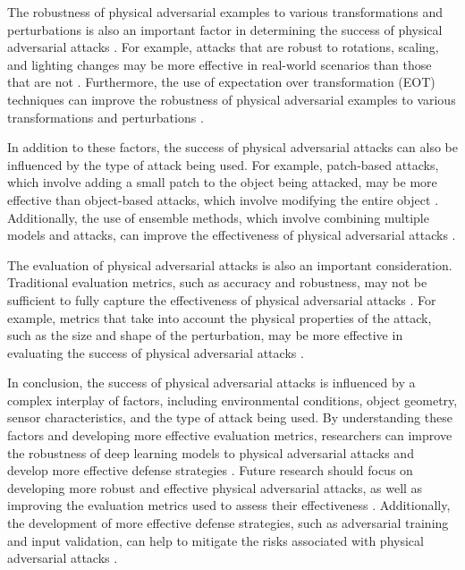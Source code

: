 \documentclass[11pt,a4paper]{article}
\begin{document}
The robustness of physical adversarial examples to various transformations and perturbations is also an important factor in determining the success of physical adversarial attacks \cite{doi:10.1609/aaai.v34i01.5443}. For example, attacks that are robust to rotations, scaling, and lighting changes may be more effective in real-world scenarios than those that are not \cite{arxiv:1802.06430}. Furthermore, the use of expectation over transformation (EOT) techniques can improve the robustness of physical adversarial examples to various transformations and perturbations \cite{doi:10.1109/cvpr42600.2020.01426}.

In addition to these factors, the success of physical adversarial attacks can also be influenced by the type of attack being used. For example, patch-based attacks, which involve adding a small patch to the object being attacked, may be more effective than object-based attacks, which involve modifying the entire object \cite{doi:10.1109/biosig52210.2021.9548291}. Additionally, the use of ensemble methods, which involve combining multiple models and attacks, can improve the effectiveness of physical adversarial attacks \cite{doi:10.1109/asp-dac47756.2020.9045584}.

The evaluation of physical adversarial attacks is also an important consideration. Traditional evaluation metrics, such as accuracy and robustness, may not be sufficient to fully capture the effectiveness of physical adversarial attacks \cite{doi:10.1007/978-3-030-58589-1_3}. For example, metrics that take into account the physical properties of the attack, such as the size and shape of the perturbation, may be more effective in evaluating the success of physical adversarial attacks \cite{arxiv:2007.04137}.

In conclusion, the success of physical adversarial attacks is influenced by a complex interplay of factors, including environmental conditions, object geometry, sensor characteristics, and the type of attack being used. By understanding these factors and developing more effective evaluation metrics, researchers can improve the robustness of deep learning models to physical adversarial attacks and develop more effective defense strategies \cite{arxiv:2001.05574}. Future research should focus on developing more robust and effective physical adversarial attacks, as well as improving the evaluation metrics used to assess their effectiveness \cite{doi:10.1109/tip.2021.3092822}. Additionally, the development of more effective defense strategies, such as adversarial training and input validation, can help to mitigate the risks associated with physical adversarial attacks \cite{doi:10.1109/cvpr42600.2020.00049}.
\end{document}
